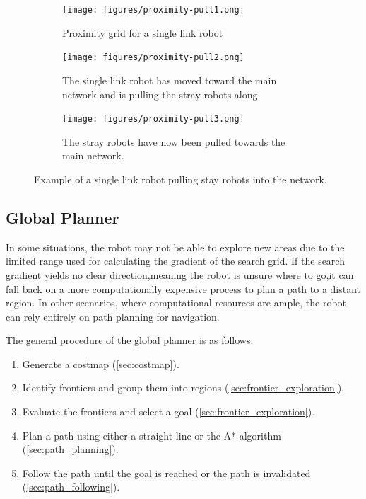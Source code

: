 \begin{figure}[h]
    \begin{center}
        \begin{subfigure}[b]{0.31\textwidth}
            \centering
            \texttt{[image: figures/proximity-pull1.png]}
            \caption{Proximity grid for a {\color{red} single link} robot}
            \label{fig:proximity-pull1}
        \end{subfigure}
        \begin{subfigure}[b]{0.31\textwidth}
            \centering
            \texttt{[image: figures/proximity-pull2.png]}
            \caption{The single link robot has moved toward the main network and is pulling the stray robots along}
            \label{fig:proximity-pull2}
        \end{subfigure}
        \begin{subfigure}[b]{0.31\textwidth}
            \centering
            \texttt{[image: figures/proximity-pull3.png]}
            \caption{The stray robots have now been pulled towards the main network.}
            \label{fig:proximity-pull3}
        \end{subfigure}
    \end{center}
    \caption{Example of a {\color{red} single link} robot pulling stay robots into the network.}\label{fig:proximity-pull}
\end{figure}




\subsection{Global Planner}
In some situations, the robot may not be able to explore new areas due to the limited range used for calculating the gradient of the search grid.
If the search gradient yields no clear direction,meaning the robot is unsure where to go,it can fall back on a more computationally expensive process to plan a path to a distant region.
In other scenarios, where computational resources are ample, the robot can rely entirely on path planning for navigation.

The general procedure of the global planner is as follows:
\begin{enumerate}
  \item Generate a costmap (\cref{sec:costmap}).
  \item Identify frontiers and group them into regions (\cref{sec:frontier_exploration}).
  \item Evaluate the frontiers and select a goal (\cref{sec:frontier_exploration}).
  \item Plan a path using either a straight line or the A* algorithm (\cref{sec:path_planning}).
  \item Follow the path until the goal is reached or the path is invalidated (\cref{sec:path_following}).
\end{enumerate}

